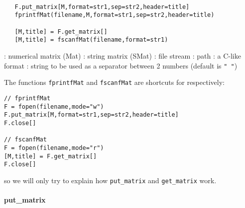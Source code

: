 

\begin{mandesc}
  \\
  \\
  \\
\end{mandesc}
\label{print}
\begin{calling_sequence}
\begin{verbatim}
   F.put_matrix[M,format=str1,sep=str2,header=title]
   fprintfMat(filename,M,format=str1,sep=str2,header=title)

   [M,title] = F.get_matrix[]
   [M,title] = fscanfMat(filename,format=str1)
\end{verbatim}
\end{calling_sequence}

\begin{parameters}
  \begin{varlist}
    : numerical matrix (Mat)
    : string matrix (SMat)
    : file stream
    : path
    : a C-like format
    : string to be used as a separator between 2 numbers (default is \verb+" "+)
  \end{varlist}
\end{parameters}

\begin{mandescription}
 The functions \verb+fprintfMat+ and \verb+fscanfMat+ are shortcuts for respectively:
\begin{Verbatim}
// fprintfMat
F = fopen(filename,mode="w")
F.put_matrix[M,format=str1,sep=str2,header=title]
F.close[]

// fscanfMat
F = fopen(filename,mode="r")
[M,title] = F.get_matrix[]
F.close[]
\end{Verbatim}
so we will only try to explain how \verb+put_matrix+ and \verb+get_matrix+ work.
\end{mandescription}

\paragraph{put\_matrix}

